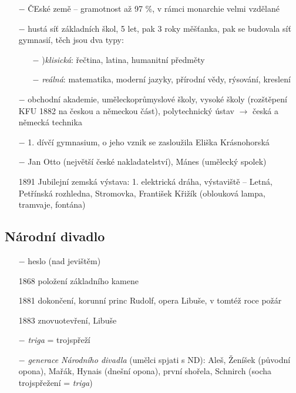 \documentclass{article}
\begin{document}
\begin{itemize}
    \vspace{-0.5em}
    \setlength\itemsep{0.15em}
    \item[$-$] ČEské země -- gramotnost až 97 \%, v rámci monarchie velmi vzdělané
    \item[$-$] hustá síť základních škol, 5 let, pak 3 roky měšťanka, pak se budovala síť gymnasií, těch jsou dva typy:
    \begin{itemize}
        \vspace{-0.5em}
        \setlength\itemsep{0.15em}
        \item[$-$] )\textit{klisická}:  řečtina, latina, humanitní předměty
        \item[$-$] \textit{reálná}: matematika, moderní jazyky, přírodní vědy, rýsování, kreslení
    \end{itemize}
    \item[$-$] obchodní akademie, uměleckoprůmyslové školy, vysoké školy (rozštěpení KFU 1882 na českou a německou část), polytechnický ústav $\rightarrow$  česká a německá technika
    \item[$-$] 1. dívčí gymnasium, o jeho vznik se zasloužila Eliška Krásnohorská
    \item[$-$] Jan Otto (největší české nakladatelství), Mánes (umělecký spolek)
    \item[1891] Jubilejní zemská výstava: 1. elektrická dráha, výstaviště -- Letná, Petřínská rozhledna, Stromovka, František Křižík (oblouková lampa, tramvaje, fontána)
\end{itemize}

\subsection*{Národní divadlo}
\begin{itemize}
    \vspace{-0.5em}
    \setlength\itemsep{0.15em}
    \item[$-$] heslo  (nad jevištěm)
    \item[1868] položení základního kamene
    \item[1881] dokončení, korunní princ Rudolf, opera Libuše, v tomtéž roce požár
    \item[1883] znovuotevření, Libuše
    \item[$-$] \textit{triga} = trojspřeží
    \item[$-$] \textit{generace Národního divadla} (umělci spjati s ND): Aleš, Ženíšek (původní opona), Mařák, Hynais (dnešní opona), první shořela, Schnirch (socha trojspřežení = \textit{triga})
\end{itemize}
\end{document}
